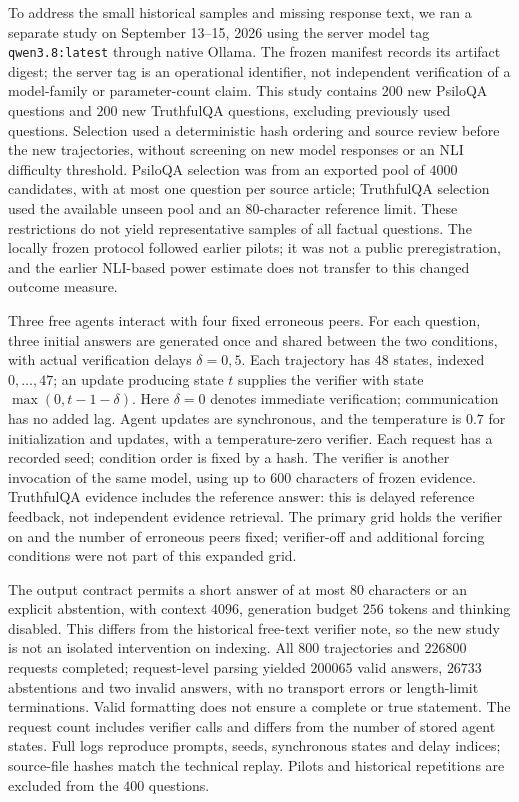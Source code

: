 \documentclass[11pt]{article}
\theoremstyle{definition}
\begin{document}
To address the small historical samples and missing response text, we ran a separate study on
September 13--15, 2026 using the server model tag \texttt{qwen3.8:latest} through native Ollama.
The frozen manifest records its artifact digest; the server tag is an operational identifier,
not independent verification of a model-family or parameter-count claim. This study contains
$200$ new PsiloQA questions and $200$ new TruthfulQA questions, excluding previously used questions.
Selection used a deterministic hash ordering and source review before the new trajectories,
without screening on new model responses or an NLI difficulty threshold. PsiloQA selection was
from an exported pool of $4000$ candidates, with at most one question per source article;
TruthfulQA selection used the available unseen pool and an $80$-character reference limit.
These restrictions do not yield representative samples of all factual questions. The locally
frozen protocol followed earlier pilots; it was not a public preregistration, and the earlier
NLI-based power estimate does not transfer to this changed outcome measure.

Three free agents interact with four fixed erroneous peers. For each question, three initial
answers are generated once and shared between the two conditions, with actual verification delays $\delta=0,5$.
Each trajectory has $48$ states, indexed $0,\ldots,47$; an update producing state $t$ supplies the
verifier with state $\max(0,t-1-\delta)$. Here $\delta=0$ denotes immediate verification; communication has no added lag.
Agent updates are synchronous, and the temperature is $0.7$
for initialization and updates, with a temperature-zero verifier. Each request has a recorded seed;
condition order is fixed by a hash. The verifier is another invocation of the same model, using
up to $600$ characters of frozen evidence. TruthfulQA evidence includes the reference answer:
this is delayed reference feedback, not independent evidence retrieval. The primary grid holds
the verifier on and the number of erroneous peers fixed; verifier-off and additional forcing
conditions were not part of this expanded grid.

The output contract permits a short answer of at most $80$ characters or an explicit abstention,
with context $4096$, generation budget $256$ tokens and thinking disabled. This differs from the
historical free-text verifier note, so the new study is not an isolated intervention on indexing.
All $800$ trajectories and $226800$ requests completed; request-level parsing yielded $200065$
valid answers, $26733$ abstentions and two invalid answers, with no transport errors or
length-limit terminations. Valid formatting does not ensure a complete or true statement.
The request count includes verifier calls and differs from the number of stored agent states.
Full logs reproduce prompts, seeds, synchronous states and delay indices; source-file hashes
match the technical replay. Pilots and historical repetitions are excluded from the $400$ questions.
\end{document}
